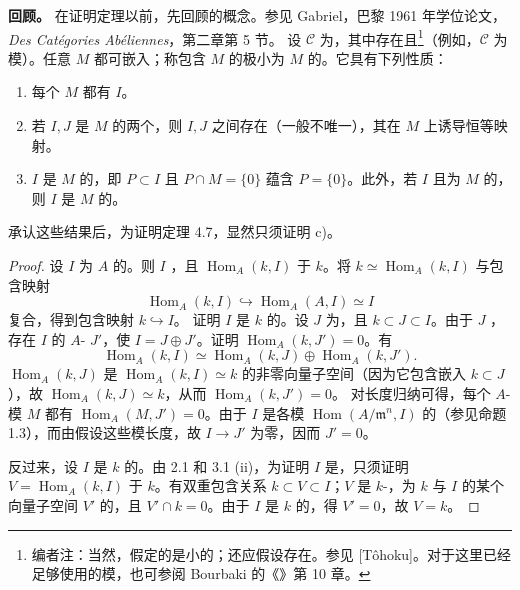 \textbf{回顾。} 在证明定理以前，先回顾的概念。参见 Gabriel，巴黎 1961 年学位论文，\emph{Des Catégories Abéliennes}，第二章第 5 节。
设 $\mathcal C$ 为，其中存在且\footnote[4]{编者注：当然，假定的是小的；还应假设存在。参见 [Tôhoku]。对于这里已经足够使用的模，也可参阅 Bourbaki 的《》第 10 章。}（例如，$\mathcal C$ 为模）。任意 $M$ 都可嵌入；称包含 $M$ 的极小为 $M$ 的。它具有下列性质：
\begin{enumerate}
\item[(i)] 每个 $M$ 都有 $I$。
\item[(ii)] 若 $I,J$ 是 $M$ 的两个，则 $I,J$ 之间存在（一般不唯一），其在 $M$ 上诱导恒等映射。
\item[(iii)] $I$ 是 $M$ 的，即 $P\subset I$ 且 $P\cap M=\{0\}$ 蕴含 $P=\{0\}$。此外，若 $I$ 且为 $M$ 的，则 $I$ 是 $M$ 的。
\end{enumerate}
承认这些结果后，为证明定理 4.7，显然只须证明 c)。
\begin{proof}
设 $I$ 为 $A$ 的。则 $I$ ，且 $\operatorname{Hom}_A(k,I)$ 于 $k$。将 $k\simeq\operatorname{Hom}_A(k,I)$ 与包含映射
\[\operatorname{Hom}_A(k,I)\hookrightarrow\operatorname{Hom}_A(A,I)\simeq I\]
复合，得到包含映射 $k\hookrightarrow I$。
证明 $I$ 是 $k$ 的。设 $J$ 为，且 $k\subset J\subset I$。由于 $J$ ，存在 $I$ 的 $A$- $J'$，使 $I=J\oplus J'$。证明 $\operatorname{Hom}_A(k,J')=0$。有
\[\operatorname{Hom}_A(k,I)\simeq\operatorname{Hom}_A(k,J)\oplus\operatorname{Hom}_A(k,J').\]
$\operatorname{Hom}_A(k,J)$ 是 $\operatorname{Hom}_A(k,I)\simeq k$ 的非零向量子空间（因为它包含嵌入 $k\subset J$），故 $\operatorname{Hom}_A(k,J)\simeq k$，从而 $\operatorname{Hom}_A(k,J')=0$。
对长度归纳可得，每个 $A$-模 $M$ 都有 $\operatorname{Hom}_A(M,J')=0$。由于 $I$ 是各模 $\operatorname{Hom}(A/\mathfrak m^n,I)$ 的（参见命题 1.3），而由假设这些模长度，故 $I\to J'$ 为零，因而 $J'=0$。

反过来，设 $I$ 是 $k$ 的。由 2.1 和 3.1 (ii)，为证明 $I$ 是，只须证明 $V=\operatorname{Hom}_A(k,I)$ 于 $k$。有双重包含关系 $k\subset V\subset I$；$V$ 是 $k$-，为 $k$ 与 $I$ 的某个向量子空间 $V'$ 的，且 $V'\cap k=0$。由于 $I$ 是 $k$ 的，得 $V'=0$，故 $V=k$。
\end{proof}
